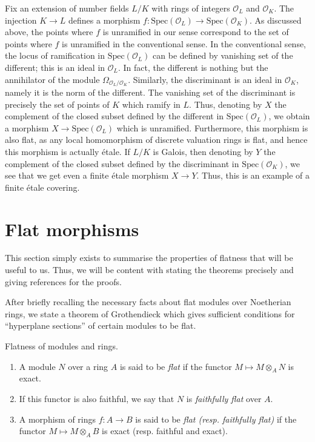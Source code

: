 \begin{example}
\label{example-number-theory-etale}
Fix an extension of number fields $L/K$ with rings of integers
$\mathcal{O}_L$ and $\mathcal{O}_K$. The injection $K \to L$ defines a
morphism $f : \text{Spec}(\mathcal{O}_L) \to \text{Spec}(\mathcal{O}_K)$.
As discussed above, the points where $f$ is unramified in our sense
correspond to the set of points where $f$ is unramified in the conventional
sense. In the conventional sense, the locus of ramification in
$\text{Spec}(\mathcal{O}_L)$ can be defined by vanishing set of the
different; this is an ideal in $\mathcal{O}_L$. In fact, the different is
nothing but the annihilator of the module
$\Omega_{\mathcal{O}_L/\mathcal{O}_K}$. Similarly, the
discriminant is an ideal in $\mathcal{O}_K$, namely it is the
norm of the different.
The vanishing set of the discriminant is precisely the set
of points of $K$ which ramify in $L$.
Thus, denoting by $X$ the complement of the closed subset
defined by the different in $\text{Spec}(\mathcal{O}_L)$,
we obtain a morphism $X \to \text{Spec}(\mathcal{O}_L)$ which is unramified.
Furthermore, this morphism is also flat, as any local homomorphism
of discrete valuation rings is flat, and hence this morphism is
actually \'etale. If $L/K$ is Galois, then denoting by
$Y$ the complement of the closed subset defined by the discriminant in
$\text{Spec}(\mathcal{O}_K)$, we see that we get even a
finite \'etale morphism $X \to Y$.
Thus, this is an example of a finite \'etale covering.
\end{example}





\section{Flat morphisms}
\label{section-flat-moprhisms}

\noindent
This section simply exists to summarise the properties of flatness that will
be useful to us. Thus, we will be content with stating the theorems precisely
and giving references for the proofs.

\medskip\noindent
After briefly recalling the necessary facts about flat modules over Noetherian
rings, we state a theorem of Grothendieck which gives sufficient conditions
for ``hyperplane sections'' of certain modules to be flat.

\begin{definition}
\label{definition-flat-rings}
Flatness of modules and rings.
\begin{enumerate}
\item A module $N$ over a ring $A$ is said to be {\it flat}
if the functor $M \mapsto M \otimes_A N$ is exact.
\item If this functor is also faithful, we say that
$N$ is {\it faithfully flat} over $A$.
\item A morphism of rings $f : A \to B$ is said to be
{\it flat (resp. faithfully flat)}
if the functor $M \mapsto M \otimes_A B$ is exact
(resp. faithful and exact).
\end{enumerate}
\end{definition}

